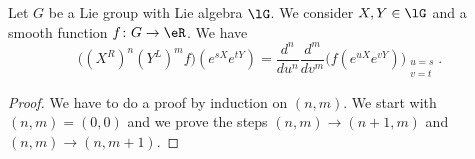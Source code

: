 \begin{proposition}       \label{PROPooKSIDooVIFkiM}
    Let \( G\) be a Lie group with Lie algebra \( \lG\). We consider \( X,Y\in \lG\) and a smooth function \( f\colon G\to \eR\). We have
    \begin{equation}
        \big( (X^R)^n(Y^L)^mf \big)( e^{sX} e^{tY})=\frac{ d^n }{ du^n }\frac{ d^m }{ dv^m }\Big( f( e^{uX} e^{vY}) \Big)_{\substack{u=s\\v=t}}.
    \end{equation}
\end{proposition}

\begin{proof}
    We have to do a proof by induction on \( (n,m)\). We start with \( (n,m)=(0,0)\) and we prove the steps \( (n,m)\to (n+1,m)\) and \( (n,m)\to (n,m+1)\).


\end{proof}
